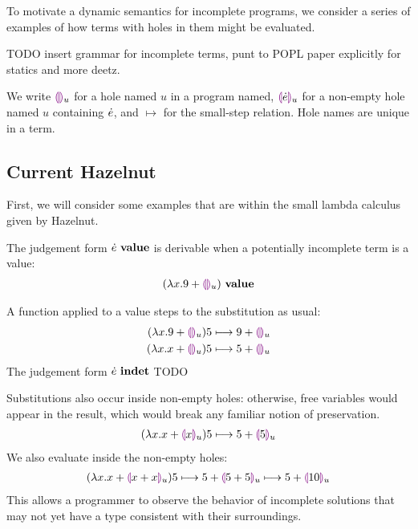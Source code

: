 To motivate a dynamic semantics for incomplete programs, we consider a
series of examples of how terms with holes in them might be evaluated.

TODO insert grammar for incomplete terms, punt to POPL paper explicitly for
statics and more deetz.

We write $\textcolor{violet}{\llparenthesis}\textcolor{violet}{\rrparenthesis}_{u}$ for a hole named $u$ in a program named,
$\textcolor{violet}{\llparenthesis}\dot{e}\textcolor{violet}{\rrparenthesis}_{u}$ for a non-empty hole named $u$ containing $\dot{e}$, and
$\mapsto$ for the small-step relation. Hole names are unique in a term.

\subsection{Current Hazelnut}
First, we will consider some examples that are within the small lambda
calculus given by Hazelnut.

The judgement form ${\dot{e}} ~\mathbf{value}$ is derivable when a potentially
incomplete term is a value:
\begin{align*}
  {(\lambda x. 9 + \textcolor{violet}{\llparenthesis}\textcolor{violet}{\rrparenthesis}_{u})} ~\mathbf{value}
\end{align*}

A function applied to a value steps to the substitution as usual:
\begin{align*}
  {
        (\lambda x.9 + \textcolor{violet}{\llparenthesis}\textcolor{violet}{\rrparenthesis}_{u})5
      } \longmapsto {
        9 + \textcolor{violet}{\llparenthesis}\textcolor{violet}{\rrparenthesis}_{u}
      }
      \\
      {
        (\lambda x.x + \textcolor{violet}{\llparenthesis}\textcolor{violet}{\rrparenthesis}_{u})5
      } \longmapsto {
        5 + \textcolor{violet}{\llparenthesis}\textcolor{violet}{\rrparenthesis}_{u}
      }
\end{align*}
The judgement form ${\dot{e}} ~\mathbf{indet}$ TODO

Substitutions also occur inside non-empty holes: otherwise, free variables
would appear in the result, which would break any familiar notion of
preservation.
\begin{align*}
  {
        (\lambda x.x + \textcolor{violet}{\llparenthesis}x\textcolor{violet}{\rrparenthesis}_{u})5
      } \longmapsto {
        5 + \textcolor{violet}{\llparenthesis}5\textcolor{violet}{\rrparenthesis}_{u}
      }
\end{align*}
We also evaluate inside the non-empty holes:
\begin{align*}
  {
    {
          (\lambda x.x + \textcolor{violet}{\llparenthesis}x + x\textcolor{violet}{\rrparenthesis}_{u})5
        } \longmapsto {
          5 + \textcolor{violet}{\llparenthesis}5 + 5\textcolor{violet}{\rrparenthesis}_{u}
        }
  } \longmapsto {5 + \textcolor{violet}{\llparenthesis}10\textcolor{violet}{\rrparenthesis}_{u}}
\end{align*}
This allows a programmer to observe the behavior of incomplete solutions
that may not yet have a type consistent with their surroundings.

